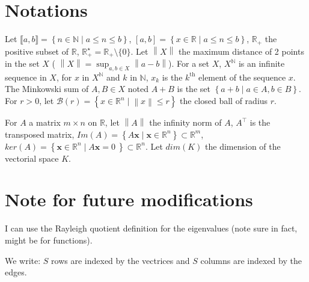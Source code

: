 \documentclass{article}
\begin{document}
\newcommand{\argmin}{\operatornamewithlimits{argmin}}

\newtheorem{theorem}{Theorem}
\newtheorem{definition}{Definition}
\newtheorem{property}{Property}

\theoremstyle{named}
\newtheorem*{namedtheorem}{Theorem}
\newtheorem*{nameddefinition}{Definition}

\newcommand\numberthis{\addtocounter{equation}{1}\tag{\theequation}}

\newcommand\vone{\mathds{1}}


\section*{Notations}

Let $\llbracket a,b \rrbracket = \left \{n \in \mathbb{N} \mid a \leq n \leq b \right \}$, $\left [ a,b \right ]= \left \{x \in \mathbb{R} \mid a \leq n \leq b \right \}$, $\mathbb{R}_+$ the positive subset of $\mathbb{R}$, $\mathbb{R}_+^\star = \mathbb{R}_+ \setminus \{0\}$.
Let $\left \| X \right \|$ the maximum distance of 2 points in the set $X$ ( $\left \| X \right \| = \sup_{a,b \in X} \left \| a-b\right \|$).
For a set $X$, $X^\mathbb{N}$ is an infinite sequence in $X$, for $x$ in $X^\mathbb{N}$ and $k$ in $\mathbb{N}$, $x_k$ is the $k^\textrm{th}$ element of the sequence $x$.
The Minkowski sum of $A,B \in X$ noted $A+B$ is the set $\left \{a+b \mid a \in A, b\in B \right \}$.
For $r>0$, let $\mathcal{B}(r) = \left \{ x \in \mathbb{R}^n \mid \left \| x \right \| \leq r \right \}$ the closed ball of radius $r$.

For $A$ a matrix $m \times n$ on $\mathbb{R}$, let $\left \| A \right \|$ the infinity norm of $A$, $A^\top$ is the transposed matrix,
$Im(A) = \left \{ A \mathbf{x} \mid \mathbf{x}  \in \mathbb{R}^n \right \} \subset \mathbb{R}^m$, 
$ker(A) = \left \{ \mathbf{x} \in \mathbb{R}^n \mid A \mathbf{x} = 0\ \right \} \subset \mathbb{R}^n$.
Let $dim(K)$ the dimension of the vectorial space $K$.



\section{Note for future modifications}
I can use the Rayleigh quotient definition for the eigenvalues (note sure in fact, might be for functions).

We write: $S$ rows are indexed  by the vectrices and $S$ columns are indexed by the edges.
\end{document}
